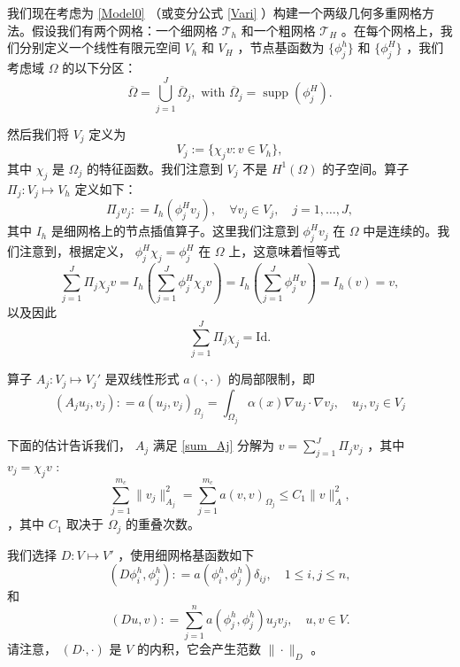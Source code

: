 \documentclass[12pt]{acta_2011xz}
\begin{document}
我们现在考虑为    \eqref{Model0}   （或变分公式
   \eqref{Vari}    ）构建一个两级几何多重网格方法。假设我们有两个网格：一个细网格    $\mathcal T_h$    和一个粗网格    $\mathcal T_H$    。在每个网格上，我们分别定义一个线性有限元空间    $V_h$    和    $V_H$   ，节点基函数为
   $ \{ \phi_j^h \} $    和    $ \{ \phi_j^H \} $    ，我们考虑域    $\Omega$    的以下分区：
   \begin{equation}
  \overline{\Omega}=\bigcup_{j=1}^J\overline{\Omega}_j, \text{ with } \overline{\Omega}_j=\operatorname{supp}(\phi_j^H).
\end{equation}     

然后我们将    $V_j$    定义为 
   \begin{equation}
    V_j :=  \{ \chi_jv: v\in V_h \} ,
\end{equation}    其中    $\chi_j$    是    $\Omega_j$    的特征函数。我们注意到    $V_j$    不是    $H^1(\Omega)$    的子空间。算子    $\Pi_j: V_j\mapsto V_h$    定义如下：
   \begin{equation}\label{pi-gamg}
    \Pi_j v_j: = I_h(\phi_j^H v_j), \quad \forall v_j\in V_j,\quad j=1,\ldots,J,
\end{equation}    其中    $I_h$    是细网格上的节点插值算子。这里我们注意到    $\phi_j^H v_j$    在    $\Omega$    中是连续的。我们注意到，根据定义，   $\phi^{H}_j \chi_j = \phi^{H}_j$    在
   $\Omega$    上，这意味着恒等式
   $$
\sum_{j=1}^J \Pi_j \chi_j v = I_h\left(\sum_{j=1}^J\phi_j^H\chi_j
  v\right)
= I_h\left(\sum_{j=1}^J\phi_j^Hv\right)
=I_h(v)=v,
$$    以及因此
   $$
\sum_{j=1}^J \Pi_j \chi_j =\mathrm{Id}. 
$$     

算子    $A_j: V_j\mapsto V_j'$    是双线性形式    $a(\cdot, \cdot)$    的局部限制，即
   \begin{equation}\label{gmg-Aj}
    (A_j u_j, v_j): = a(u_j, v_j)_{\Omega_j} = \int_{\Omega_j}\alpha(x)\nabla u_j\cdot \nabla v_j, \quad u_j, v_j\in V_j
\end{equation}     

下面的估计告诉我们，   $A_j$    满足
   \eqref{sum_Aj}    分解为    $v=\sum_{j=1}^J\Pi_jv_j$    ，其中    $v_j=\chi_jv$    :
   $$
    \sum_{j=1}^{m_c}\|v_j\|_{A_j}^2  =  \sum_{j=1}^{m_c} a(v, v)_{\Omega_j}\le C_1\|v\|_A^2,
$$    ，其中    $C_1$    取决于    $\Omega_j$    的重叠次数。  

我们选择    $D: V \mapsto V'$   ，使用细网格基函数如下 
   \begin{equation}
    (D \phi_i^h, \phi_j^h): = a(\phi_i^h, \phi_j^h)\delta_{ij}, \quad 1\le i, j\le n,
\end{equation}    和
   \begin{equation}\label{duv}
    (D u, v): = \sum_{j=1}^na(\phi_j^h, \phi_j^h)u_jv_j, \quad u, v\in V. 
\end{equation}    请注意，   $(D\cdot, \cdot)$    是    $V$    的内积，它会产生范数    $\|\cdot\|_D$    。  
\end{document}

